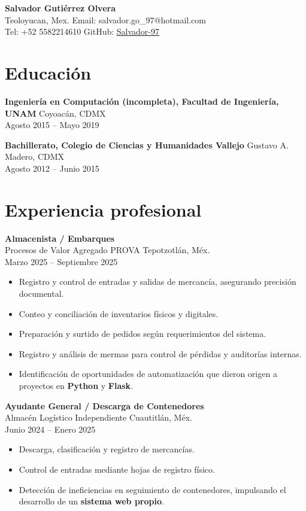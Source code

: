 \documentclass[11pt]{article}
\begin{document}
\begin{center}
    {\LARGE \textbf{Salvador Gutiérrez Olvera}} \\
    Teoloyucan, Mex. \hfill Email: salvador.go\_97@hotmail.com \\
    Tel: +52 5582214610 \hfill GitHub: \href{https://github.com/Salvador-97}{Salvador-97}
\end{center}

\vspace{6pt}

\section*{Educación}

\textbf{Ingeniería en Computación (incompleta), Facultad de Ingeniería, UNAM} \hfill Coyoacán, CDMX \\
Agosto 2015 -- Mayo 2019

\textbf{Bachillerato, Colegio de Ciencias y Humanidades Vallejo} \hfill Gustavo A. Madero, CDMX \\
Agosto 2012 -- Junio 2015

\vspace{6pt}

\section*{Experiencia profesional}

\textbf{Almacenista / Embarques} \\
Procesos de Valor Agregado PROVA \hfill Tepotzotlán, Méx. \\
Marzo 2025 -- Septiembre 2025
\begin{itemize}[leftmargin=*, noitemsep]
    \item Registro y control de entradas y salidas de mercancía, asegurando precisión documental.
    \item Conteo y conciliación de inventarios físicos y digitales.
    \item Preparación y surtido de pedidos según requerimientos del sistema.
    \item Registro y análisis de mermas para control de pérdidas y auditorías internas.
    \item Identificación de oportunidades de automatización que dieron origen a proyectos en \textbf{Python} y \textbf{Flask}.
\end{itemize}

\textbf{Ayudante General / Descarga de Contenedores} \\
Almacén Logístico Independiente \hfill Cuautitlán, Méx. \\
Junio 2024 -- Enero 2025
\begin{itemize}[leftmargin=*, noitemsep]
    \item Descarga, clasificación y registro de mercancías.
    \item Control de entradas mediante hojas de registro físico.
    \item Detección de ineficiencias en seguimiento de contenedores, impulsando el desarrollo de un \textbf{sistema web propio}.
\end{itemize}
\end{document}
